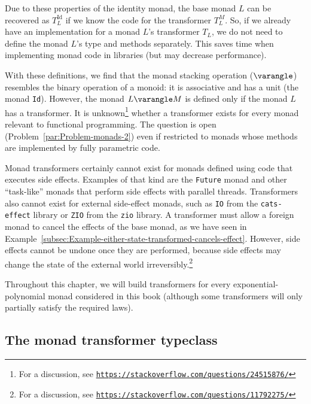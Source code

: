 Due to these properties of the identity monad, the base monad $L$
can be recovered as $T_{L}^{\text{Id}}$ if we know the code for the
transformer $T_{L}^{M}$. So, if we already have an implementation
for a monad $L$\textsf{'}s transformer $T_{L}$, we do not need to define
the monad $L$\textsf{'}s type and methods separately. This saves time when
implementing monad code in libraries (but may decrease performance).

With these definitions, we find that the monad stacking operation
($\varangle$) resembles the binary operation of a monoid: it is associative
and has a unit (the monad \lstinline!Id!). However, the monad $L\varangle M$
is defined only if the monad $L$ has a transformer. It is unknown\footnote{For a discussion, see \texttt{\href{https://stackoverflow.com/questions/24515876/}{https://stackoverflow.com/questions/24515876/}}}
whether a transformer exists for every monad relevant to functional
programming. The question is open (Problem~\ref{par:Problem-monads-2})
even if restricted to monads whose methods are implemented by fully
parametric code.

Monad transformers certainly cannot exist for monads defined using
code that executes side effects. Examples of that kind are the \lstinline!Future!
monad and other \textsf{``}task-like\textsf{''} monads that perform side effects with
parallel threads. Transformers also cannot exist for external side-effect
monads, such as \lstinline!IO! from the \lstinline!cats-effect!
library or \lstinline!ZIO! from the \lstinline!zio! library. A transformer
must allow a foreign monad to cancel the effects of the base monad,
as we have seen in Example~\ref{subsec:Example-either-state-transformed-cancels-effect}.
However, side effects cannot be undone once they are performed, because
side effects may change the state of the external world irreversibly.\footnote{For a discussion, see \texttt{\href{https://stackoverflow.com/questions/11792275/}{https://stackoverflow.com/questions/11792275/}}} 

Throughout this chapter, we will build transformers for every exponential-polynomial
monad considered in this book (although some transformers will only
partially satisfy the required laws).

\subsection{The monad transformer typeclass}

